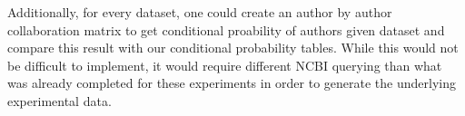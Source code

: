 Additionally, for every dataset, one could create an author by author collaboration matrix to get conditional proability of authors given dataset and compare this result with our conditional probability tables. While this would not be difficult to implement, it would require different NCBI querying than what was already completed for these experiments in order to generate the underlying experimental data. 
